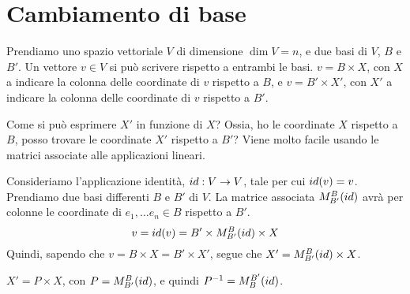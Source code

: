 \section{Cambiamento di base}

Prendiamo uno spazio vettoriale $V$ di dimensione $\dim V = n$, e due basi di $V$, $B$ e $B'$. Un vettore $v \in V$ si pu\`o scrivere rispetto a entrambi le basi. $v = B \times X$, con $X$ a indicare la colonna delle coordinate di $v$ rispetto a $B$, e $v = B' \times X'$, con $X'$ a indicare la colonna delle coordinate di $v$ rispetto a $B'$.

Come si pu\`o esprimere $X'$ in funzione di $X$? Ossia, ho le coordinate $X$ rispetto a $B$, posso trovare le coordinate $X'$ rispetto a $B'$? Viene molto facile usando le matrici associate alle applicazioni lineari.

Consideriamo l'applicazione identit\`a, $id : V \to V$, tale per cui $id(v) = v$. Prendiamo due basi differenti $B$ e $B'$ di $V$. La matrice associata $M_{B'}^{B} (id)$ avr\`a per colonne le coordinate di $e_1, \ldots e_n \in B$ rispetto a $B'$.
\[
v = id(v) = B' \times M_{B'}^{B} (id) \times X
\]
Quindi, sapendo che $v = B \times X = B' \times X'$, segue che $ X' = M_{B'}^{B} (id) \times X$.

$X' = P \times X$, con $P = M_{B'}^{B} (id)$, e quindi $P^{-1} = M_{B}^{B'} (id)$.

